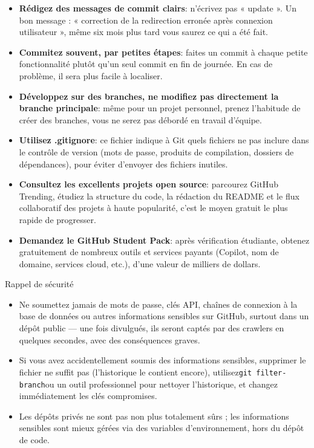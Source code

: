 \begin{itemize}
  \item \textbf{Rédigez des messages de commit clairs}: n’écrivez pas « update ». Un bon message : « correction de la redirection erronée après connexion utilisateur », même six mois plus tard vous saurez ce qui a été fait.
  \item \textbf{Commitez souvent, par petites étapes}: faites un commit à chaque petite fonctionnalité plutôt qu’un seul commit en fin de journée. En cas de problème, il sera plus facile à localiser.
  \item \textbf{Développez sur des branches, ne modifiez pas directement la branche principale}: même pour un projet personnel, prenez l’habitude de créer des branches, vous ne serez pas débordé en travail d’équipe.
  \item \textbf{Utilisez .gitignore}: ce fichier indique à Git quels fichiers ne pas inclure dans le contrôle de version (mots de passe, produits de compilation, dossiers de dépendances), pour éviter d’envoyer des fichiers inutiles.
  \item \textbf{Consultez les excellents projets open source}: parcourez GitHub Trending, étudiez la structure du code, la rédaction du README et le flux collaboratif des projets à haute popularité, c’est le moyen gratuit le plus rapide de progresser.
  \item \textbf{Demandez le GitHub Student Pack}: après vérification étudiante, obtenez gratuitement de nombreux outils et services payants (Copilot, nom de domaine, services cloud, etc.), d’une valeur de milliers de dollars.
\end{itemize}

\begin{tcbwarn}{Rappel de sécurité}
\begin{itemize}
  \item Ne soumettez jamais de mots de passe, clés API, chaînes de connexion à la base de données ou autres informations sensibles sur GitHub, surtout dans un dépôt public — une fois divulgués, ils seront captés par des crawlers en quelques secondes, avec des conséquences graves.
  \item Si vous avez accidentellement soumis des informations sensibles, supprimer le fichier ne suffit pas (l’historique le contient encore), utilisez\texttt{git filter-\allowbreak branch}ou un outil professionnel pour nettoyer l’historique, et changez immédiatement les clés compromises.
  \item Les dépôts privés ne sont pas non plus totalement sûrs ; les informations sensibles sont mieux gérées via des variables d'environnement, hors du dépôt de code.
\end{itemize}

\end{tcbwarn}

